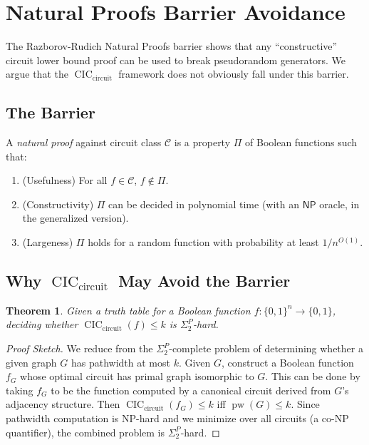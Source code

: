 \documentclass[11pt]{article}
\theoremstyle{plain}
\newtheorem{theorem}{Theorem}[section]
\theoremstyle{definition}
\newcommand{\pw}{\operatorname{pw}}
\newcommand{\CIC}{\operatorname{CIC}}
\newcommand{\CICcirc}{\CIC_{\text{circuit}}}
\newcommand{\NP}{\mathsf{NP}}
\newcommand{\set}[1]{\{#1\}}
\begin{document}
\section{Natural Proofs Barrier Avoidance}\label{sec:natural-proofs}

The Razborov-Rudich Natural Proofs barrier \cite{RazborovRudich97} shows that any ``constructive'' circuit lower bound proof can be used to break pseudorandom generators. We argue that the $\CICcirc$ framework does not obviously fall under this barrier.

\subsection{The Barrier}

A \emph{natural proof} against circuit class $\mathcal{C}$ is a property $\Pi$ of Boolean functions such that:
\begin{enumerate}[label=(\roman*)]
    \item (Usefulness) For all $f \in \mathcal{C}$, $f \notin \Pi$.
    \item (Constructivity) $\Pi$ can be decided in polynomial time (with an $\NP$ oracle, in the generalized version).
    \item (Largeness) $\Pi$ holds for a random function with probability at least $1/n^{O(1)}$.
\end{enumerate}

\subsection{Why $\CICcirc$ May Avoid the Barrier}

\begin{theorem}\label{thm:sigma2-hard}
Given a truth table for a Boolean function $f : \set{0,1}^n \to \set{0,1}$, deciding whether $\CICcirc(f) \leq k$ is $\Sigma_2^P$-hard.
\end{theorem}

\begin{proof}[Proof Sketch]
We reduce from the $\Sigma_2^P$-complete problem of determining whether a given graph $G$ has pathwidth at most $k$. Given $G$, construct a Boolean function $f_G$ whose optimal circuit has primal graph isomorphic to $G$. This can be done by taking $f_G$ to be the function computed by a canonical circuit derived from $G$'s adjacency structure. Then $\CICcirc(f_G) \leq k$ iff $\pw(G) \leq k$. Since pathwidth computation is NP-hard and we minimize over all circuits (a co-NP quantifier), the combined problem is $\Sigma_2^P$-hard.
\end{proof}
\end{document}
